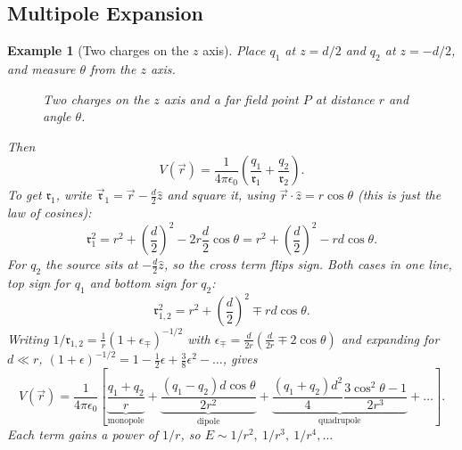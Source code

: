 \documentclass{article}
\newtheorem*{example}{Example}
\begin{document}
\subsection{Multipole Expansion}
\begin{example}[Two charges on the $z$ axis]
    Place $q_1$ at $z = d/2$ and $q_2$ at $z = -d/2$, and measure $\theta$ from the $z$ axis.
    \begin{figure}[H]
        \centering
        \caption{Two charges on the $z$ axis and a far field point $P$ at distance $r$ and angle $\theta$.}
    \end{figure}
    Then
    \[V(\vec{r}) = \frac{1}{4\pi\epsilon_0}\left(\frac{q_1}{\mathfrak{r}_1} + \frac{q_2}{\mathfrak{r}_2}\right).\]
    To get $\mathfrak{r}_1$, write $\vec{\mathfrak{r}}_1 = \vec{r} - \frac{d}{2}\hat{z}$ and square it, using $\vec{r}\cdot\hat{z} = r\cos\theta$ (this is just the law of cosines):
    \[\mathfrak{r}_1^2 = r^2 + \left(\frac{d}{2}\right)^2 - 2r\frac{d}{2}\cos\theta = r^2 + \left(\frac{d}{2}\right)^2 - rd\cos\theta.\]
    For $q_2$ the source sits at $-\frac{d}{2}\hat{z}$, so the cross term flips sign. Both cases in one line, top sign for $q_1$ and bottom sign for $q_2$:
    \[\mathfrak{r}_{1,2}^2 = r^2 + \left(\frac{d}{2}\right)^2 \mp rd\cos\theta.\]
    Writing $1/\mathfrak{r}_{1,2} = \frac{1}{r}(1+\epsilon_\mp)^{-1/2}$ with $\epsilon_\mp = \frac{d}{2r}\left(\frac{d}{2r} \mp 2\cos\theta\right)$ and expanding for $d \ll r$, $(1+\epsilon)^{-1/2} = 1 - \frac{1}{2}\epsilon + \frac{3}{8}\epsilon^2 - \dots$, gives
    \[V(\vec{r}) = \frac{1}{4\pi\epsilon_0}\left[\underbrace{\frac{q_1+q_2}{r}}_{\text{monopole}} + \underbrace{\frac{(q_1-q_2)d\cos\theta}{2r^2}}_{\text{dipole}} + \underbrace{\frac{(q_1+q_2)d^2}{4}\frac{3\cos^2\theta - 1}{2r^3}}_{\text{quadrupole}} + \dots\right].\]
    Each term gains a power of $1/r$, so $E \sim 1/r^2,\ 1/r^3,\ 1/r^4, \dots$
\end{example}
\end{document}
